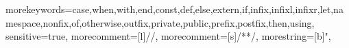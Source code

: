 

\usepackage{a4wide}



\usepackage{mathpazo}

\usepackage[T1]{fontenc}
\usepackage{textcomp}
\usepackage[scaled=0.86]{beramono}



\usepackage{listings}
{morekeywords={case,when,with,end,const,def,else,extern,if,infix,infixl,infixr,let,namespace,nonfix,of,otherwise,outfix,private,public,prefix,postfix,then,using},
 sensitive=true,
 morecomment=[l]{//},
 morecomment=[s]{/*}{*/},
 morestring=[b]",
}
\lstset{language=pure,columns=flexible}
\lstset{basicstyle=\ttfamily,keepspaces=true,commentstyle=,showstringspaces=false}

\usepackage[breaklinks]{hyperref}
\hypersetup{bookmarksnumbered,pdfborder=0 0 0}


